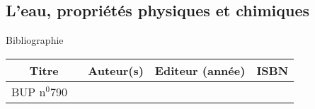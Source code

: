 \begin{headerBlock}
\chapter{L'eau, propriétés physiques et chimiques}
\label{LC_Eau}
 \end{headerBlock}



\begin{reportBlock}{Bibliographie}

\begin{center}
\begin{tabular}{|c|c|c|c|}\hline
Titre & Auteur(s) & Editeur (année) & ISBN \\ \hline
BUP n$^0$790 ~ & ~ & ~ & ~ \\
\hline
\end{tabular}
\end{center}

\end{reportBlock}


